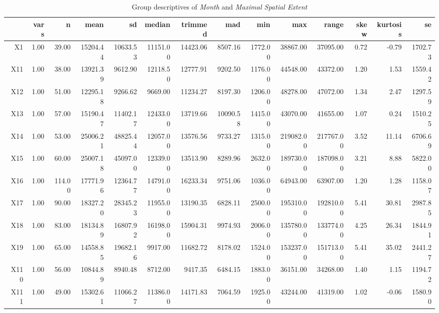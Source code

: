 \begin{table}[ht]
	\tiny
	\centering
	\begin{tabular}{rrrrrrrrrrrrrr}
		\toprule
		& vars & n & mean & sd & median & trimmed & mad & min & max & range & skew & kurtosis & se \\ 
		\midrule
		X1   & 1.00 & 39.00 & 15204.44 & 10633.53 & 11151.00 & 14423.06 & 8507.16 & 1772.00 & 38867.00 & 37095.00 & 0.72 & -0.79 & 1702.73 \\ 
		X11  & 1.00 & 38.00 & 13921.39 & 9612.90 & 12118.50 & 12777.91 & 9202.50 & 1176.00 & 44548.00 & 43372.00 & 1.20 & 1.53 & 1559.42 \\ 
		X12  & 1.00 & 51.00 & 12295.18 & 9266.62 & 9669.00 & 11234.27 & 8197.30 & 1206.00 & 48278.00 & 47072.00 & 1.34 & 2.47 & 1297.59 \\ 
		X13  & 1.00 & 57.00 & 15190.47 & 11402.17 & 12433.00 & 13719.66 & 10090.58 & 1415.00 & 43070.00 & 41655.00 & 1.07 & 0.24 & 1510.25 \\ 
		X14  & 1.00 & 53.00 & 25006.21 & 48825.44 & 12057.00 & 13576.56 & 9733.27 & 1315.00 & 219082.00 & 217767.00 & 3.52 & 11.14 & 6706.69 \\ 
		X15  & 1.00 & 60.00 & 25007.18 & 45097.00 & 12339.00 & 13513.90 & 8289.96 & 2632.00 & 189730.00 & 187098.00 & 3.21 & 8.88 & 5822.00 \\ 
		X16  & 1.00 & 114.00 & 17771.96 & 12364.77 & 14791.00 & 16233.34 & 9751.06 & 1036.00 & 64943.00 & 63907.00 & 1.20 & 1.28 & 1158.07 \\ 
		X17  & 1.00 & 90.00 & 18327.20 & 28345.23 & 11955.00 & 13190.35 & 6828.11 & 2500.00 & 195310.00 & 192810.00 & 5.41 & 30.81 & 2987.85 \\ 
		X18  & 1.00 & 83.00 & 18134.89 & 16807.92 & 16198.00 & 15904.31 & 9974.93 & 2006.00 & 135780.00 & 133774.00 & 4.25 & 26.34 & 1844.91 \\ 
		X19  & 1.00 & 65.00 & 14558.85 & 19682.16 & 9917.00 & 11682.72 & 8178.02 & 1524.00 & 153237.00 & 151713.00 & 5.41 & 35.02 & 2441.27 \\ 
		X110 & 1.00 & 56.00 & 10844.89 & 8940.48 & 8712.00 & 9417.35 & 6484.15 & 1883.00 & 36151.00 & 34268.00 & 1.40 & 1.15 & 1194.72 \\ 
		X111 & 1.00 & 49.00 & 15302.61 & 11066.27 & 11386.00 & 14171.83 & 7064.59 & 1925.00 & 43244.00 & 41319.00 & 1.02 & -0.06 & 1580.90 \\ 
		\bottomrule
	\end{tabular}
    \caption{Group descriptives of \textit{Month} and \textit{Maximal Spatial Extent}}
    \label{tbl:descriptives_baysis_effector_AUrs1_Cov}
\end{table}

